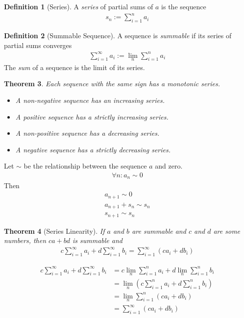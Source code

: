 \documentclass{amsart}
\numberwithin{equation}{section}
\let\oldendproof\endproof
\renewenvironment{proof}[1][\proofname]{%
  \setcounter{case}{0}
  \setcounter{step}{0}
  \oldproof[#1]%
}{\oldendproof}
\theoremstyle{plain}
\newtheorem{theorem}{Theorem}[section]
\theoremstyle{definition}
\newtheorem{definition}[theorem]{Definition}
\theoremstyle{remark}
\begin{document}
\begin{definition}[Series]
  A \emph{series} of partial sums of $a$ is the sequence
  \begin{align}
    s_n := \sum^n_{i=1} a_i
  \end{align}
\end{definition}

\begin{definition}[Summable Sequence]
  A sequence is \emph{summable} if its series of partial sums converges
  \begin{align}
    \sum^\infty_{i=1} a_i := \lim_n \sum^n_{i=1} a_i
  \end{align}
  The \emph{sum} of a sequence is the limit of its series.
\end{definition}

\begin{theorem}
  Each sequence with the same sign has a monotonic series.
  \begin{itemize}
  \item A non-negative sequence has an increasing series.
  \item A positive sequence has a strictly increasing series.
  \item A non-positive sequence has a decreasing series.
  \item A negative sequence has a strictly decreasing series.
  \end{itemize}
\end{theorem}
\begin{proof}
  Let $\sim$ be the relationship between the sequence $a$ and zero.
  \begin{align}
    \forall n: a_n\sim 0
  \end{align}
  Then %
  \begin{align}
    a_{n+1} \sim 0\\
    a_{n+1} + s_n \sim s_n\\
    s_{n+1} \sim s_n
  \end{align}
\end{proof}

\begin{theorem}[Series Linearity]
  If $a$ and $b$ are summable and $c$ and $d$ are some numbers, then $ca+bd$ is summable and
  \begin{align}
    c\sum_{i=1}^\infty a_i + d\sum_{i=1}^\infty b_i = \sum_{i=1}^\infty (ca_i+db_i)
  \end{align}
\end{theorem}
\begin{proof}
  \begin{align}
    c\sum_{i=1}^\infty a_i + d\sum_{i=1}^\infty b_i &= c\lim_{n} \sum^n_{i =1} a_i + d \lim_n \sum^n_{i=1}b_i\\
    &= \lim_n \left(c\sum^n_{i=1} a_i +  d\sum^n_{i=1} b_i \right)\\
    &= \lim_n \sum^n_{i=1} (ca_i+db_i)\\
    &= \sum^\infty_{i=1} (ca_i + db_i)
  \end{align}
\end{proof}
\end{document}
